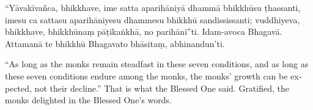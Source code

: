 \documentclass[
  babelLanguage=portuguese,
  final,
  a4Paper,
]{chantingbook}
\begin{document}
“Yāvakīvañca, bhikkhave, ime satta aparihāniyā dhammā bhikkhūsu ṭhassanti, imesu
ca sattasu aparihāniyesu dhammesu bhikkhū sandississanti; vuddhiyeva, bhikkhave,
bhikkhūnaṃ pāṭikaṅkhā, no parihānī”ti. Idam-avoca Bhagavā. Attamanā te bhikkhū
Bhagavato bhāsitaṃ, abhinandun'ti.

\begin{english}
  “As long as the monks remain steadfast in these seven conditions, and as long
  as these seven conditions endure among the monks, the monks' growth can be
  expected, not their decline.” That is what the Blessed One said. Gratified,
  the monks delighted in the Blessed One's words.
\end{english}
\end{document}

